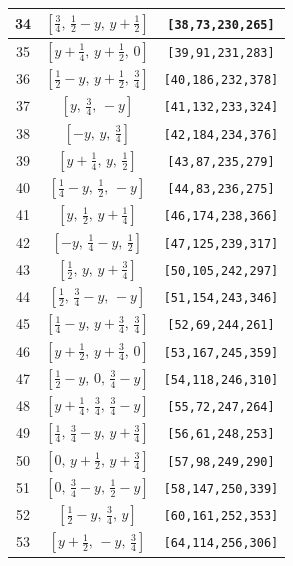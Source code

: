 \documentclass[fleqn,8pt]{jsarticle}
\begin{document}
\begin{longtable}{ccc}
34 & $\left[ \frac{3}{4},\, \frac{1}{2} - y,\, y + \frac{1}{2} \right]$ & {\tt [38,73,230,265]} \\ \hline
35 & $\left[ y + \frac{1}{4},\, y + \frac{1}{2},\, 0 \right]$ & {\tt [39,91,231,283]} \\ \hline
36 & $\left[ \frac{1}{2} - y,\, y + \frac{1}{2},\, \frac{3}{4} \right]$ & {\tt [40,186,232,378]} \\ \hline
37 & $\left[ y,\, \frac{3}{4},\, - y \right]$ & {\tt [41,132,233,324]} \\ \hline
38 & $\left[ - y,\, y,\, \frac{3}{4} \right]$ & {\tt [42,184,234,376]} \\ \hline
39 & $\left[ y + \frac{1}{4},\, y,\, \frac{1}{2} \right]$ & {\tt [43,87,235,279]} \\ \hline
40 & $\left[ \frac{1}{4} - y,\, \frac{1}{2},\, - y \right]$ & {\tt [44,83,236,275]} \\ \hline
41 & $\left[ y,\, \frac{1}{2},\, y + \frac{1}{4} \right]$ & {\tt [46,174,238,366]} \\ \hline
42 & $\left[ - y,\, \frac{1}{4} - y,\, \frac{1}{2} \right]$ & {\tt [47,125,239,317]} \\ \hline
43 & $\left[ \frac{1}{2},\, y,\, y + \frac{3}{4} \right]$ & {\tt [50,105,242,297]} \\ \hline
44 & $\left[ \frac{1}{2},\, \frac{3}{4} - y,\, - y \right]$ & {\tt [51,154,243,346]} \\ \hline
45 & $\left[ \frac{1}{4} - y,\, y + \frac{3}{4},\, \frac{3}{4} \right]$ & {\tt [52,69,244,261]} \\ \hline
46 & $\left[ y + \frac{1}{2},\, y + \frac{3}{4},\, 0 \right]$ & {\tt [53,167,245,359]} \\ \hline
47 & $\left[ \frac{1}{2} - y,\, 0,\, \frac{3}{4} - y \right]$ & {\tt [54,118,246,310]} \\ \hline
48 & $\left[ y + \frac{1}{4},\, \frac{3}{4},\, \frac{3}{4} - y \right]$ & {\tt [55,72,247,264]} \\ \hline
49 & $\left[ \frac{1}{4},\, \frac{3}{4} - y,\, y + \frac{3}{4} \right]$ & {\tt [56,61,248,253]} \\ \hline
50 & $\left[ 0,\, y + \frac{1}{2},\, y + \frac{3}{4} \right]$ & {\tt [57,98,249,290]} \\ \hline
51 & $\left[ 0,\, \frac{3}{4} - y,\, \frac{1}{2} - y \right]$ & {\tt [58,147,250,339]} \\ \hline
52 & $\left[ \frac{1}{2} - y,\, \frac{3}{4},\, y \right]$ & {\tt [60,161,252,353]} \\ \hline
53 & $\left[ y + \frac{1}{2},\, - y,\, \frac{3}{4} \right]$ & {\tt [64,114,256,306]} \\ \hline

\end{longtable}
\end{document}
